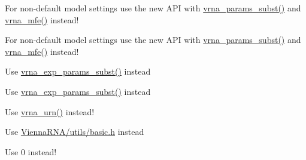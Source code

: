 \begin{DoxyRefList}
\item[\label{deprecated__deprecated000070}%
\Hypertarget{deprecated__deprecated000070}%
Global \hyperlink{group__mfe__global__deprecated_ga41bf8f6fa15b94471f7095cad9f0ccf3}{update\+\_\+fold\+\_\+params} (void)]For non-\/default model settings use the new A\+PI with \hyperlink{group__energy__parameters_ga5d1909208f7ea3baa98b75afaa1f62ca}{vrna\+\_\+params\+\_\+subst()} and \hyperlink{group__mfe__global_gabd3b147371ccf25c577f88bbbaf159fd}{vrna\+\_\+mfe()} instead! 
\item[\label{deprecated__deprecated000071}%
\Hypertarget{deprecated__deprecated000071}%
Global \hyperlink{group__mfe__global__deprecated_gae66dc422efb8f5d56717d92d6002a9f8}{update\+\_\+fold\+\_\+params\+\_\+par} (vrna\+\_\+param\+\_\+t $\ast$parameters)]For non-\/default model settings use the new A\+PI with \hyperlink{group__energy__parameters_ga5d1909208f7ea3baa98b75afaa1f62ca}{vrna\+\_\+params\+\_\+subst()} and \hyperlink{group__mfe__global_gabd3b147371ccf25c577f88bbbaf159fd}{vrna\+\_\+mfe()} instead! 
\item[\label{deprecated__deprecated000099}%
\Hypertarget{deprecated__deprecated000099}%
Global \hyperlink{group__part__func__global__deprecated_ga384e927890f9c034ff09fa66da102d28}{update\+\_\+pf\+\_\+params} (int length)]Use \hyperlink{group__energy__parameters_ga8e7ac4fab3b0cc03afbc134eaafb3525}{vrna\+\_\+exp\+\_\+params\+\_\+subst()} instead 
\item[\label{deprecated__deprecated000100}%
\Hypertarget{deprecated__deprecated000100}%
Global \hyperlink{group__part__func__global__deprecated_gaafe2d1b21f5418b123b088aa395e827d}{update\+\_\+pf\+\_\+params\+\_\+par} (int length, vrna\+\_\+exp\+\_\+param\+\_\+t $\ast$parameters)]Use \hyperlink{group__energy__parameters_ga8e7ac4fab3b0cc03afbc134eaafb3525}{vrna\+\_\+exp\+\_\+params\+\_\+subst()} instead 
\item[\label{deprecated__deprecated000173}%
\Hypertarget{deprecated__deprecated000173}%
Global \hyperlink{utils_2basic_8h_aaa328491c84996e445d027fde9800f2e}{urn} (void)]Use \hyperlink{group__utils_ga384e256ebb295d04a14426179db0dd6e}{vrna\+\_\+urn()} instead!  
\item[\label{deprecated__deprecated000136}%
\Hypertarget{deprecated__deprecated000136}%
File \hyperlink{utils_8h}{utils.h} ]Use \hyperlink{utils_2basic_8h}{Vienna\+R\+N\+A/utils/basic.\+h} instead  
\item[\label{deprecated__deprecated000148}%
\Hypertarget{deprecated__deprecated000148}%
Global \hyperlink{group__constraints_ga62e0ed0c33002c09423de4e646f85a2b}{V\+R\+N\+A\+\_\+\+C\+O\+N\+S\+T\+R\+A\+I\+N\+T\+\_\+\+F\+I\+LE} ]Use 0 instead!



\end{DoxyRefList}
